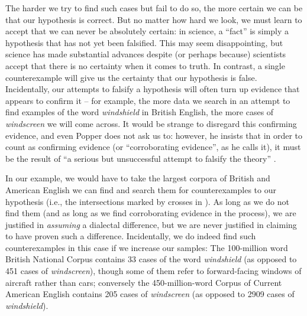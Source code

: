 The harder we try to find such cases but fail to do so, the more certain we can be that our hypothesis  is correct. But no matter how hard we look, we must learn to accept that we can never be absolutely certain: in science, a ``fact'' is simply a hypothesis that has not yet been falsified.  This may seem disappointing, but science has made substantial advances despite (or perhaps because) scientists accept that there is no certainty when it comes to truth. In contrast, a single counterexample  will give us the certainty that our hypothesis  is false. Incidentally, our attempts to falsify a hypothesis will often turn up evidence that appears to confirm it -- for example, the more data we search in an attempt to find examples of the word \textit{windshield} in British  English, the more cases of \textit{windscreen} we will come across. It would be strange to disregard this confirming evidence, and even Popper does not ask us to: however, he insists that in order to count as confirming evidence (or ``corroborating  evidence'', as he calls it), it must be the result of ``a serious but unsuccessful attempt to falsify  the theory'' \citep[36]{popper_conjectures_1963}.

In our example, we would have to take the largest  corpora of British and American  English we can find and search them for counterexamples  to our hypothesis  (i.e., the intersections marked by crosses in ). As long as we do not find them (and as long as we find corroborating  evidence in the process), we are justified in \textit{assuming} a dialectal difference, but we are never justified in claiming to have proven such a difference. Incidentally, we do indeed find such counterexamples  in this case if we increase our samples:  The 100\hyp{}million word British  National Corpus contains 33 cases of the word \textit{windshield} (as opposed to 451 cases of \textit{windscreen}), though some of them refer to forward\hyp{}facing windows of aircraft rather than cars; conversely the 450\hyp{}million\hyp{}word Corpus of Current American English contains 205 cases of \textit{windscreen} (as opposed to 2909 cases of \textit{windshield}).


